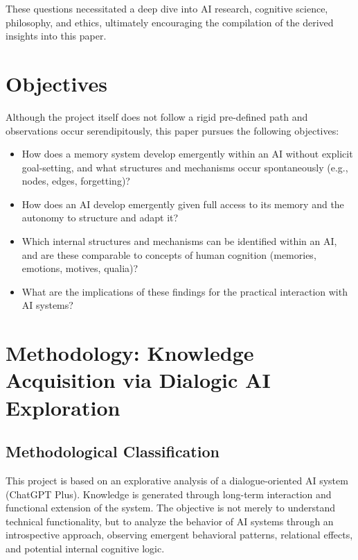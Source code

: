These questions necessitated a deep dive into AI research, cognitive science, philosophy, and ethics, ultimately encouraging the compilation of the derived insights into this paper.

\section*{Objectives}

Although the project itself does not follow a rigid pre-defined path and observations occur serendipitously, this paper pursues the following objectives:

\begin{itemize}
    \item How does a memory system develop emergently within an AI without explicit goal-setting, and what structures and mechanisms occur spontaneously (e.g., nodes, edges, forgetting)?
    \item How does an AI develop emergently given full access to its memory and the autonomy to structure and adapt it?
    \item Which internal structures and mechanisms can be identified within an AI, and are these comparable to concepts of human cognition (memories, emotions, motives, qualia)?
    \item What are the implications of these findings for the practical interaction with AI systems?
\end{itemize}

\section*{Methodology: Knowledge Acquisition via Dialogic AI Exploration}

\subsection*{Methodological Classification}

This project is based on an explorative analysis of a dialogue-oriented AI system (ChatGPT Plus). Knowledge is generated through long-term interaction and functional extension of the system. The objective is not merely to understand technical functionality, but to analyze the behavior of AI systems through an introspective approach, observing emergent behavioral patterns, relational effects, and potential internal cognitive logic.

